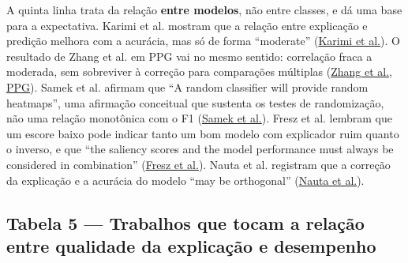 \documentclass[11pt,a4paper]{article}
\begin{document}
A quinta linha trata da relação \textbf{entre modelos}, não entre classes, e dá uma base para a expectativa. Karimi et al. mostram que a relação entre explicação e predição melhora com a acurácia, mas só de forma ``moderate'' (\href{https://arxiv.org/abs/2212.06925}{Karimi et al.}). O resultado de Zhang et al. em PPG vai no mesmo sentido: correlação fraca a moderada, sem sobreviver à correção para comparações múltiplas (\href{https://pmc.ncbi.nlm.nih.gov/articles/PMC7978398/}{Zhang et al., PPG}). Samek et al. afirmam que ``A random classifier will provide random heatmaps'', uma afirmação conceitual que sustenta os testes de randomização, não uma relação monotônica com o F1 (\href{https://arxiv.org/abs/1509.06321}{Samek et al.}). Fresz et al. lembram que um escore baixo pode indicar tanto um bom modelo com explicador ruim quanto o inverso, e que ``the saliency scores and the model performance must always be considered in combination'' (\href{https://arxiv.org/abs/2406.05068}{Fresz et al.}). Nauta et al. registram que a correção da explicação e a acurácia do modelo ``may be orthogonal'' (\href{https://arxiv.org/abs/2201.08164}{Nauta et al.}).

\subsection{Tabela 5 — Trabalhos que tocam a relação entre qualidade da explicação e desempenho}
\end{document}

